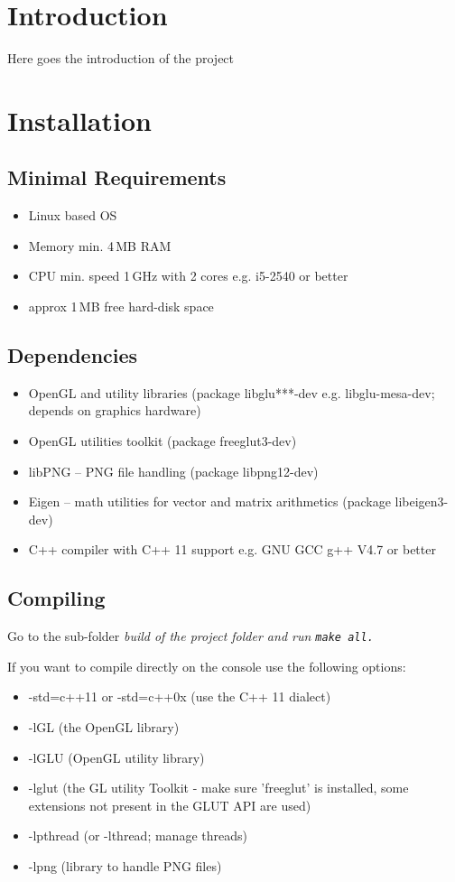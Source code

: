 \section{Introduction}
Here goes the introduction of the project

\section{Installation}
\subsection{Minimal Requirements}
\begin{itemize}
	\item Linux based OS
	\item Memory min. 4\,MB RAM
	\item CPU min. speed 1\,GHz with 2 cores e.g. i5-2540 or better
	\item approx 1\,MB free hard-disk space
\end{itemize}
\subsection{Dependencies}
\begin{itemize}
	\item OpenGL and utility libraries (package libglu***-dev e.g. libglu-mesa-dev; depends on graphics hardware)
	\item OpenGL utilities toolkit (package freeglut3-dev)
	\item libPNG  -- PNG file handling (package libpng12-dev)
	\item Eigen -- math utilities for vector and matrix arithmetics (package libeigen3-dev)
	\item C++ compiler with C++ 11 support e.g. GNU GCC g++ V4.7 or better
\end{itemize}
\subsection{Compiling}
Go to the sub-folder \it{build} of the project folder and run \tt{make all}.\par
If you want to compile directly on the console use the following options:  
\begin{itemize}
	\item -std=c++11 or -std=c++0x (use the C++ 11 dialect)  
	\item -lGL (the OpenGL library)  
	\item -lGLU (OpenGL utility library)
	\item -lglut (the GL utility Toolkit - make sure 'freeglut' is installed, some extensions not present in the GLUT API are used)  
	\item -lpthread (or -lthread; manage threads)  
	\item -lpng (library to handle PNG files)
\end{itemize}
